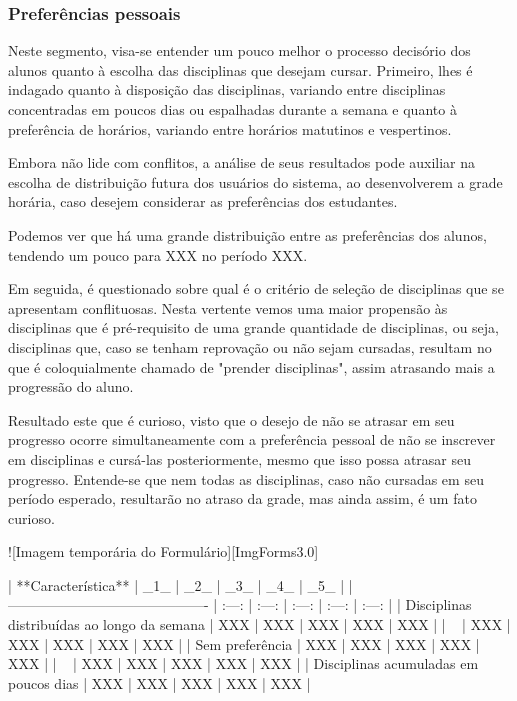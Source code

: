 \subsubsection{Preferências pessoais} %

Neste segmento, visa-se entender um pouco melhor o processo decisório dos alunos quanto à escolha das disciplinas que desejam cursar. Primeiro, lhes é indagado quanto à disposição das disciplinas, variando entre disciplinas concentradas em poucos dias ou espalhadas durante a semana e quanto à preferência de horários, variando entre horários matutinos e vespertinos.

Embora não lide com conflitos, a análise de seus resultados pode auxiliar na escolha de distribuição futura dos usuários do sistema, ao desenvolverem a grade horária, caso desejem considerar as preferências dos estudantes.

Podemos ver que há uma grande distribuição entre as preferências dos alunos, tendendo um pouco para XXX no período XXX.

Em seguida, é questionado sobre qual é o critério de seleção de disciplinas que se apresentam conflituosas. Nesta vertente vemos uma maior propensão às disciplinas que é pré-requisito de uma grande quantidade de disciplinas, ou seja, disciplinas que, caso se tenham reprovação ou não sejam cursadas, resultam no que é coloquialmente chamado de "prender disciplinas", assim atrasando mais a progressão do aluno.

Resultado este que é curioso, visto que o desejo de não se atrasar em seu progresso ocorre simultaneamente com a preferência pessoal de não se inscrever em disciplinas e cursá-las posteriormente, mesmo que isso possa atrasar seu progresso. Entende-se que nem todas as disciplinas, caso não cursadas em seu período esperado, resultarão no atraso da grade, mas ainda assim, é um fato curioso.

![Imagem temporária do Formulário][ImgForms3.0]

| **Característica**                          |  _1_  |  _2_  |  _3_  |  _4_  |  _5_  |
| ------------------------------------------- | :---: | :---: | :---: | :---: | :---: |
| Disciplinas distribuídas ao longo da semana |  XXX  |  XXX  |  XXX  |  XXX  |  XXX  |
| ~                                           |  XXX  |  XXX  |  XXX  |  XXX  |  XXX  |
| Sem preferência                             |  XXX  |  XXX  |  XXX  |  XXX  |  XXX  |
| ~                                           |  XXX  |  XXX  |  XXX  |  XXX  |  XXX  |
| Disciplinas acumuladas em poucos dias       |  XXX  |  XXX  |  XXX  |  XXX  |  XXX  |

